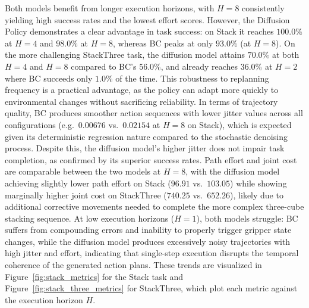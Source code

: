 \documentclass[11pt,a4paper]{article}
\begin{document}
Both models benefit from longer execution horizons, with $H=8$ consistently yielding high success rates and the lowest effort scores. However, the Diffusion Policy demonstrates a clear advantage in task success: on Stack it reaches $100.0\%$ at $H=4$ and $98.0\%$ at $H=8$, whereas BC peaks at only $93.0\%$ (at $H=8$). On the more challenging StackThree task, the diffusion model attains $70.0\%$ at both $H=4$ and $H=8$ compared to BC's $56.0\%$, and already reaches $36.0\%$ at $H=2$ where BC succeeds only $1.0\%$ of the time. This robustness to replanning frequency is a practical advantage, as the policy can adapt more quickly to environmental changes without sacrificing reliability. In terms of trajectory quality, BC produces smoother action sequences with lower jitter values across all configurations (e.g.\ $0.00676$ vs.\ $0.02154$ at $H=8$ on Stack), which is expected given its deterministic regression nature compared to the stochastic denoising process. Despite this, the diffusion model's higher jitter does not impair task completion, as confirmed by its superior success rates. Path effort and joint cost are comparable between the two models at $H=8$, with the diffusion model achieving slightly lower path effort on Stack ($96.91$ vs.\ $103.05$) while showing marginally higher joint cost on StackThree ($740.25$ vs.\ $652.26$), likely due to additional corrective movements needed to complete the more complex three-cube stacking sequence. At low execution horizons ($H=1$), both models struggle: BC suffers from compounding errors and inability to properly trigger gripper state changes, while the diffusion model produces excessively noisy trajectories with high jitter and effort, indicating that single-step execution disrupts the temporal coherence of the generated action plans. These trends are visualized in Figure~\ref{fig:stack_metrics} for the Stack task and Figure~\ref{fig:stack_three_metrics} for StackThree, which plot each metric against the execution horizon $H$.
\end{document}
